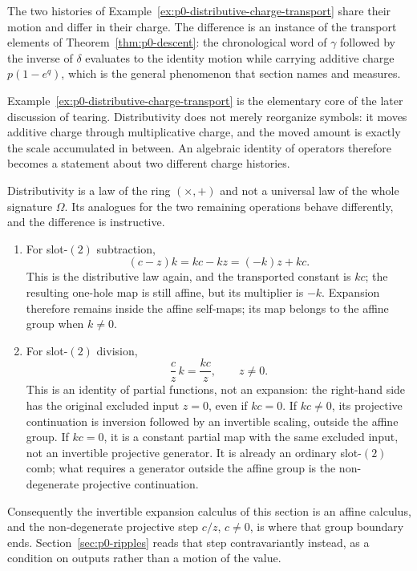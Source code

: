 The two histories of Example~\ref{ex:p0-distributive-charge-transport} share
their motion and differ in their charge.  The difference is an instance of the
transport elements of Theorem~\ref{thm:p0-descent}: the chronological word of
$\gamma$ followed by the inverse of $\delta$ evaluates to the identity motion
while carrying additive charge $p(1-e^{q})$, which is the general phenomenon
that section names and measures.

Example~\ref{ex:p0-distributive-charge-transport} is the elementary core of the
later discussion of tearing.  Distributivity does not merely reorganize
symbols: it moves additive charge through multiplicative charge, and the moved
amount is exactly the scale accumulated in between.  An algebraic identity of
operators therefore becomes a statement about two different charge histories.

\begin{remark}
\label{rem:p0-expansion-boundary}
Distributivity is a law of the ring $(\times,+)$ and not a universal law of the
whole signature $\Omega$.  Its analogues for the two remaining operations
behave differently, and the difference is instructive.

\begin{enumerate}
  \item For slot-$(2)$ subtraction,
  \[
    (c-z)k=kc-kz=(-k)z+kc .
  \]
  This is the distributive law again, and the transported constant is $kc$;
  the resulting one-hole map is still affine, but its multiplier is $-k$.
  Expansion therefore remains inside the affine self-maps; its map belongs
  to the affine group when $k\ne0$.

  \item For slot-$(2)$ division,
  \[
    \frac{c}{z}\,k=\frac{kc}{z},
    \qquad z\ne0 .
  \]
  This is an identity of partial functions, not an expansion: the right-hand
  side has the original excluded input $z=0$, even if $kc=0$.  If $kc\ne0$,
  its projective continuation is inversion followed by an invertible scaling,
  outside the affine group.  If $kc=0$, it is a constant partial map with
  the same excluded input, not an invertible projective generator.  It is
  already an ordinary slot-$(2)$ comb; what requires a generator outside the
  affine group is the non-degenerate projective continuation.
\end{enumerate}

Consequently the invertible expansion calculus of this section is an affine
calculus, and the non-degenerate projective step $c/z$, $c\ne0$, is
where that group boundary ends.  Section~\ref{sec:p0-ripples}
reads that step contravariantly instead, as a condition on outputs rather than
a motion of the value.
\end{remark}

